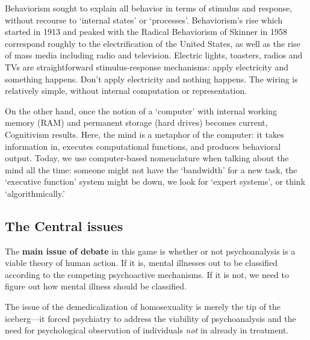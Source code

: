 Behaviorism sought to explain all behavior in terms of stimulus and response, without recourse to `internal states' or `processes'. Behaviorism's rise which started in 1913 and peaked with the Radical Behaviorism of Skinner in 1958 correspond roughly to the electrification of the United States, as well as the rise of mass media including radio and television. Electric lights, toasters, radios and TVs are straightforward stimulus-response mechanisms: apply electricity and something happens. Don't apply electricity and nothing happens. The wiring is relatively simple, without internal computation or representation. 

On the other hand, once the notion of a `computer' with internal working memory (RAM) and permanent storage (hard drives) becomes current, Cognitivism results. Here, the mind is a metaphor of the computer: it takes information in, executes computational functions, and produces behavioral output. Today, we use computer-based nomenclature when talking about the mind all the time: someone might not have the `bandwidth' for a new task, the `executive function' system might be down, we look for `expert systems', or think `algorithmically.' 

\subsection{The Central issues}
\label{thecentralissues}

The \textbf{main issue of debate} in this game is whether or not psychoanalysis is a viable theory of human action. If it is, mental illnesses out to be classified according to the competing psychoactive mechanisms. If it is not, we need to figure out how mental illness should be classified.

The issue of the demedicalization of homosexuality is merely the tip of the iceberg---it forced psychiatry to address the viability of psychoanalysis and the need for psychological observation of individuals \emph{not} in already in treatment.

